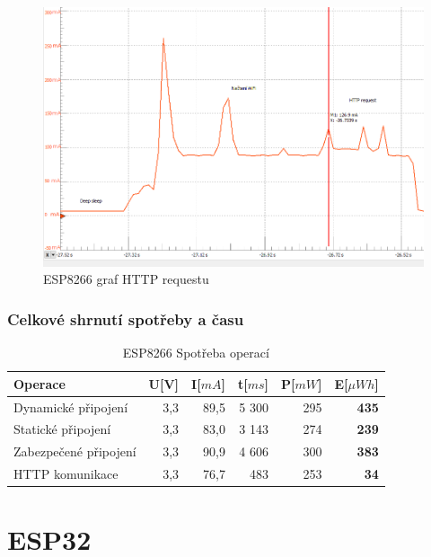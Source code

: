 \documentclass[a4paper, 12pt]{report}
\begin{document}
    \begin{figure}[h]
        \centering
        \includegraphics[width=12cm]{images/ESP8266_http}
        \caption{ESP8266 graf HTTP requestu}
        \label{fig:esp8266_http}
    \end{figure}

    \subsubsection{Celkové shrnutí spotřeby a času}

    \begin{table}[h]
        \centering
        \caption{ESP8266 Spotřeba operací}
        \begin{tabular}{||l| r r r r |r||}
            \hline
            Operace               & U[V] & I[$mA$] & t[$ms$] & P[$mW$] & \textbf{E}[$\mu Wh$] \\
            \hline
            \hline
            Dynamické připojení   & 3,3  & 89,5    & 5 300  & 295     & \textbf{435}         \\
            Statické připojení    & 3,3  & 83,0    & 3 143  & 274     & \textbf{239}         \\
            Zabezpečené připojení & 3,3  & 90,9    & 4 606  & 300     & \textbf{383}         \\
            HTTP komunikace       & 3,3  & 76,7    & 483     & 253     & \textbf{34}          \\
            \hline
        \end{tabular}
        \label{tab:esp8266-spotreba-operaci}
    \end{table}


    \section{ESP32}
\end{document}
